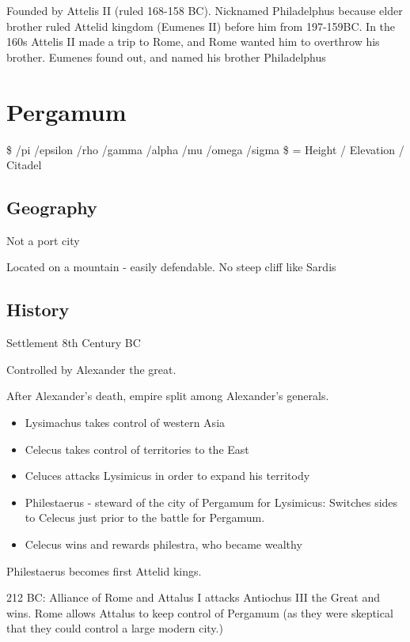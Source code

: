 \documentclass[
]{book}
\providecommand{\tightlist}{%
  \setlength{\itemsep}{0pt}\setlength{\parskip}{0pt}}
\begin{document}
Founded by Attelis II (ruled 168-158 BC). Nicknamed Philadelphus because elder brother ruled Attelid kingdom (Eumenes II) before him from 197-159BC. In the 160s Attelis II made a trip to Rome, and Rome wanted him to overthrow his brother. Eumenes found out, and named his brother Philadelphus

\hypertarget{pergamum}{%
\chapter{Pergamum}\label{pergamum}}

\$ /pi /epsilon /rho /gamma /alpha /mu /omega /sigma \$ = Height / Elevation / Citadel

\hypertarget{geography-2}{%
\section{Geography}\label{geography-2}}

Not a port city

Located on a mountain - easily defendable. No steep cliff like Sardis

\hypertarget{history-4}{%
\section{History}\label{history-4}}

Settlement 8th Century BC

Controlled by Alexander the great.

After Alexander's death, empire split among Alexander's generals.

\begin{itemize}
\tightlist
\item
  Lysimachus takes control of western Asia
\item
  Celecus takes control of territories to the East
\item
  Celuces attacks Lysimicus in order to expand his territody
\item
  Philestaerus - steward of the city of Pergamum for Lysimicus: Switches sides to Celecus just prior to the battle for Pergamum.
\item
  Celecus wins and rewards philestra, who became wealthy
\end{itemize}

Philestaerus becomes first Attelid kings.

212 BC: Alliance of Rome and Attalus I attacks Antiochus III the Great and wins. Rome allows Attalus to keep control of Pergamum (as they were skeptical that they could control a large modern city.)
\end{document}
